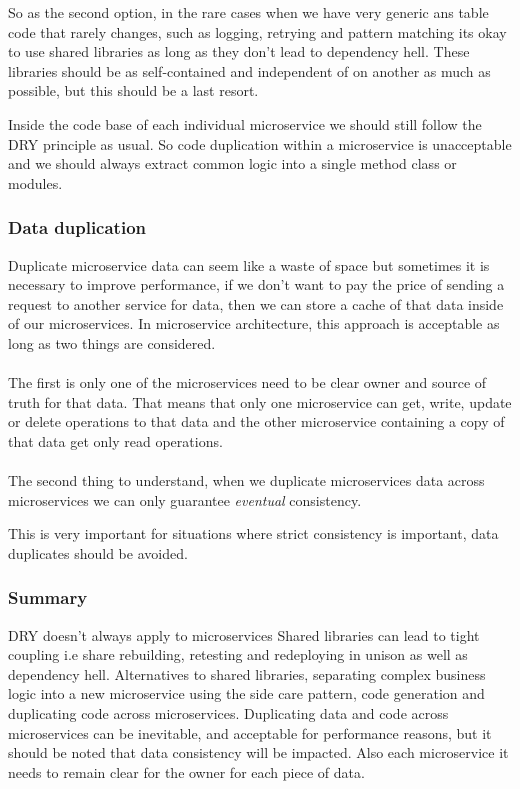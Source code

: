 So as the second option, in the rare cases when we have very generic ans table code that rarely changes, such as logging, retrying and pattern matching its okay to use shared libraries as long as they don't lead to dependency hell.
These libraries should be as self-contained and independent of on another as much as possible, but this should be a last resort.

\begin{note}
    Inside the code base of each individual microservice we should still follow the DRY principle as usual.
    So code duplication within a microservice is unacceptable and we should always extract common logic into a single method class or modules.
\end{note}

\subsubsection{Data duplication}
Duplicate microservice data can seem like a waste of space but sometimes it is necessary to improve performance, if we don't want to pay the price of sending a request to another service for data, then we can store a cache of that data inside of our microservices.
In microservice architecture, this approach is acceptable as long as two things are considered.

\paragraph{}
The first is only one of the microservices need to be clear owner and source of truth for that data.
That means that only one microservice can get, write, update or delete operations to that data and the other microservice containing a copy of that data get only read operations.

\paragraph{}
The second thing to understand, when we duplicate microservices data across microservices we can only guarantee \textit{eventual} consistency.

\begin{note}
    This is very important for situations where strict consistency is important, data duplicates should be avoided.
\end{note}

\subsubsection{Summary}
DRY doesn't always apply to microservices
Shared libraries can lead to tight coupling i.e share rebuilding, retesting and redeploying in unison as well as dependency hell.
Alternatives to shared libraries, separating complex business logic into a new microservice using the side care pattern, code generation and duplicating code across microservices.
Duplicating data and code across microservices can be inevitable, and acceptable for performance reasons, but it should be noted that data consistency will be impacted.
Also each microservice it needs to remain clear for the owner for each piece of data.

